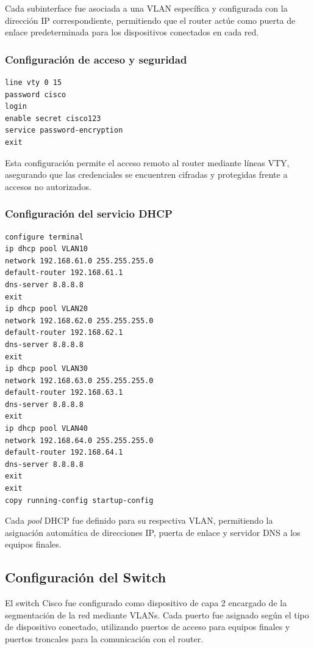 Cada subinterface fue asociada a una VLAN específica y configurada con la dirección IP correspondiente, permitiendo que el router actúe como puerta de enlace predeterminada para los dispositivos conectados en cada red.

\subsubsection{Configuración de acceso y seguridad}

\begin{lstlisting}[caption={Configuración de seguridad y acceso remoto en el Router}]
line vty 0 15
password cisco
login
enable secret cisco123
service password-encryption
exit
\end{lstlisting}

Esta configuración permite el acceso remoto al router mediante líneas VTY, asegurando que las credenciales se encuentren cifradas y protegidas frente a accesos no autorizados.

\subsubsection{Configuración del servicio DHCP}

\begin{lstlisting}[caption={Configuración de pools DHCP para cada VLAN}]
configure terminal
ip dhcp pool VLAN10
network 192.168.61.0 255.255.255.0
default-router 192.168.61.1
dns-server 8.8.8.8
exit
ip dhcp pool VLAN20
network 192.168.62.0 255.255.255.0
default-router 192.168.62.1
dns-server 8.8.8.8
exit
ip dhcp pool VLAN30
network 192.168.63.0 255.255.255.0
default-router 192.168.63.1
dns-server 8.8.8.8
exit
ip dhcp pool VLAN40
network 192.168.64.0 255.255.255.0
default-router 192.168.64.1
dns-server 8.8.8.8
exit
exit
copy running-config startup-config
\end{lstlisting}

Cada \textit{pool} DHCP fue definido para su respectiva VLAN, permitiendo la asignación automática de direcciones IP, puerta de enlace y servidor DNS a los equipos finales.

\subsection{Configuración del Switch}

El switch Cisco fue configurado como dispositivo de capa 2 encargado de la segmentación de la red mediante VLANs. Cada puerto fue asignado según el tipo de dispositivo conectado, utilizando puertos de acceso para equipos finales y puertos troncales para la comunicación con el router.

